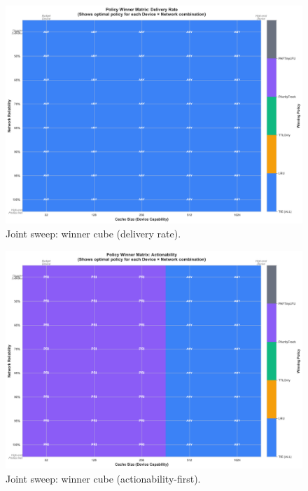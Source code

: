\documentclass[11pt,twocolumn]{article}
\begin{document}
\begin{figure}[h]
    \centering
    \includegraphics[width=\linewidth]{figures/combined_winner_cube_deliveryRate.png}
    \caption{Joint sweep: winner cube (delivery rate).}
    \label{fig:combined-winner-cube-delivery}
\end{figure}

\begin{figure}[h]
    \centering
    \includegraphics[width=\linewidth]{figures/combined_winner_cube_actionabilityFirstRatio.png}
    \caption{Joint sweep: winner cube (actionability-first).}
    \label{fig:combined-winner-cube-actionability}
\end{figure}
\end{document}
